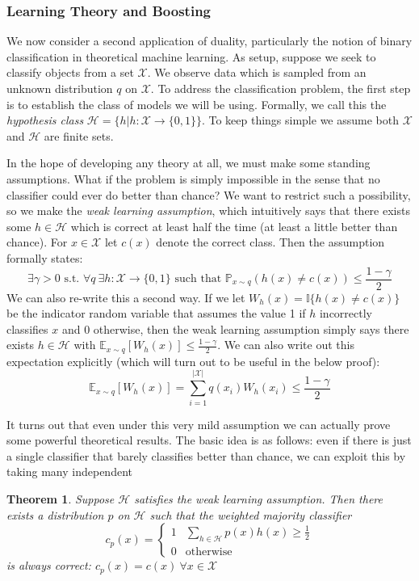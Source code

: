 \documentclass[12pt]{article}
\newcommand*{\abs}[1]{\left\lvert#1\right\rvert}
\newcommand{\E}{\mathbb{E}}
\newcommand{\Prob}{\mathbb{P}}
\newtheorem{thm}{Theorem}
\begin{document}
\subsubsection{Learning Theory and Boosting}
We now consider a second application of duality, particularly the notion of binary classification in theoretical machine learning. As setup, suppose we seek to classify objects from a set
$\mathcal{X}$. We observe data which is sampled from an unknown distribution $q$ on $\mathcal{X}$. To address the classification problem, the first step is to establish the class of 
models we will be using. Formally, we call this the \textit{hypothesis class} $\mathcal{H} = \{h | h: \mathcal{X} \to \{0, 1\}\}$. To keep things simple we assume both $\mathcal{X}$ and 
$\mathcal{H}$ are finite sets. 

In the hope of developing any theory at all, we must make some standing 
assumptions. What if the problem is simply impossible in the sense that no classifier could ever do better than chance? We want to restrict such a possibility, so we make the \textit{weak learning assumption}, 
which intuitively says that there exists some $h \in \mathcal{H}$ which is correct at least half the time (at least a little better than chance). For $x \in \mathcal{X}$ let $c(x)$ denote the correct class. Then the 
assumption formally states: 
\[\exists \gamma > 0 \text{ s.t. } \forall q \ \exists h: \mathcal{X} \to \{0, 1\} \text{ such that } \Prob_{x \sim q}\left(h(x) \neq c(x)\right) \leq \frac{1 - \gamma}{2}\]
We can also re-write this a second way. If we let $W_{h}(x) = \mathbb{I}\{h(x) \neq c(x)\}$ be the indicator random variable that assumes the value 1 if $h$ incorrectly classifies $x$ and $0$ otherwise, then 
the weak learning assumption simply says there exists $h \in \mathcal{H}$ with $\E_{x \sim q} [W_h(x)] \leq \frac{1 - \gamma}{2}$. We can also write out this expectation explicitly (which will turn out to be useful
in the below proof): 
\[\E_{x \sim q} [W_h(x)] = \sum_{i = 1}^{\abs{\mathcal{X}}} q(x_i) W_h(x_i) \leq \frac{1 - \gamma}{2}\] 

It turns out that even under this very mild assumption we can actually prove some powerful theoretical results. The basic idea is as follows: even if there is just a single classifier that barely classifies better than 
chance, we can exploit this by taking many independent 

\begin{thm}
Suppose $\mathcal{H}$ satisfies the weak learning assumption. Then there exists a distribution $p$ on $\mathcal{H}$ such that the weighted majority classifier 
\[c_p(x) = \begin{cases} 
      1 & \sum_{h \in \mathcal{H}} p(x)h(x) \geq \frac{1}{2} \\
      0 & \text{otherwise}
   \end{cases}
\]
is always correct: $c_p(x) = c(x) \ \forall x \in \mathcal{X}$
\end{thm}
\end{document}
